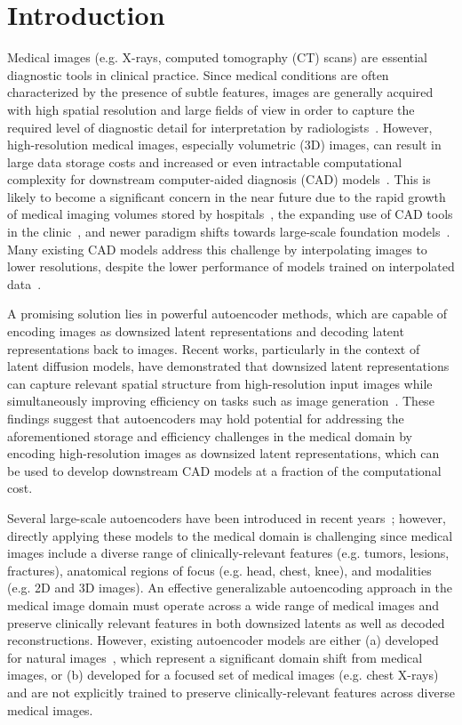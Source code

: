 \clearpage
\section{Introduction}
Medical images (e.g. X-rays, computed tomography (CT) scans) are essential diagnostic tools in clinical practice. Since medical conditions are often characterized by the presence of subtle features, images are generally acquired with high spatial resolution and large fields of view in order to capture the required level of diagnostic detail for interpretation by radiologists~\cite{huda2015resolution}. However, high-resolution medical images, especially volumetric (3D) images, can result in large data storage costs and increased or even intractable computational complexity for downstream computer-aided diagnosis (CAD) models~\cite{freire2022computational, tan2019efficientnet}. This is likely to become a significant concern in the near future due to the rapid growth of medical imaging volumes stored by hospitals~\cite{mesterhazy2020high}, the expanding use of CAD tools in the clinic~\cite{engin2020,najjar2023}, and newer paradigm shifts towards large-scale foundation models~\cite{bommasani2022opportunities,chen2024chexagentfoundationmodelchest,merlin}. Many existing CAD models address this challenge by interpolating images to lower resolutions, despite the lower performance of models trained on interpolated data~\cite{sabottke2020effect, huang2023self}. 

A promising solution lies in powerful autoencoder methods, which are capable of encoding images as downsized latent representations and decoding latent representations back to images. Recent works, particularly in the context of latent diffusion models, have demonstrated that downsized latent representations can capture relevant spatial structure from high-resolution input images while simultaneously improving efficiency on tasks such as image generation~\cite{rombach2022high}. These findings suggest that autoencoders may hold potential for addressing the aforementioned storage and efficiency challenges in the medical domain by encoding high-resolution images as downsized latent representations, which can be used to develop downstream CAD models at a fraction of the computational cost.

Several large-scale autoencoders have been introduced in recent years~\cite{rombach2022high,lee2023llmcxr}; however, directly applying these models to the medical domain is challenging since medical images include a diverse range of clinically-relevant features (e.g. tumors, lesions, fractures), anatomical regions of focus (e.g. head, chest, knee), and modalities (e.g. 2D and 3D images). An effective generalizable autoencoding approach in the medical image domain must operate across a wide range of medical images and preserve clinically relevant features in both downsized latents as well as decoded reconstructions. However, existing autoencoder models are either (a) developed for natural images~\cite{rombach2022high}, which represent a significant domain shift from medical images, or (b) developed for a focused set of medical images (e.g. chest X-rays)~\cite{lee2023llmcxr} and are not explicitly trained to preserve clinically-relevant features across diverse medical images.

